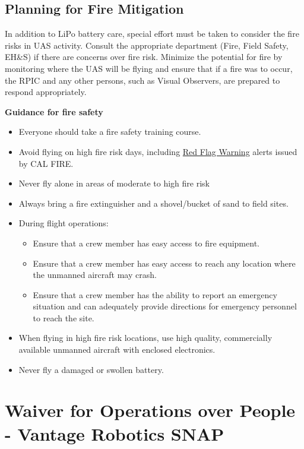 \documentclass[
]{book}
\providecommand{\tightlist}{%
  \setlength{\itemsep}{0pt}\setlength{\parskip}{0pt}}
\begin{document}
\section{Planning for Fire Mitigation}\label{planning-for-fire-mitigation}

In addition to LiPo battery care, special effort must be taken to consider the fire risks in UAS activity. Consult the appropriate department (Fire, Field Safety, EH\&S) if there are concerns over fire risk. Minimize the potential for fire by monitoring where the UAS will be flying and ensure that if a fire was to occur, the RPIC and any other persons, such as Visual Observers, are prepared to respond appropriately.

\textbf{Guidance for fire safety}

\begin{itemize}
\item
  Everyone should take a fire safety training course.
\item
  Avoid flying on high fire risk days, including \href{https://www.fire.ca.gov/programs/communications/red-flag-warnings-fire-weather-watches/}{Red Flag Warning} alerts issued by CAL FIRE.
\item
  Never fly alone in areas of moderate to high fire risk
\item
  Always bring a fire extinguisher and a shovel/bucket of sand to field sites.
\item
  During flight operations:

  \begin{itemize}
  \tightlist
  \item
    Ensure that a crew member has easy access to fire equipment.
  \item
    Ensure that a crew member has easy access to reach any location where the unmanned aircraft may crash.
  \item
    Ensure that a crew member has the ability to report an emergency situation and can adequately provide directions for emergency personnel to reach the site.
  \end{itemize}
\item
  When flying in high fire risk locations, use high quality, commercially available unmanned aircraft with enclosed electronics.
\item
  Never fly a damaged or swollen battery.
\end{itemize}

\chapter{Waiver for Operations over People - Vantage Robotics SNAP}\label{ch-part39-vantage}
\end{document}
